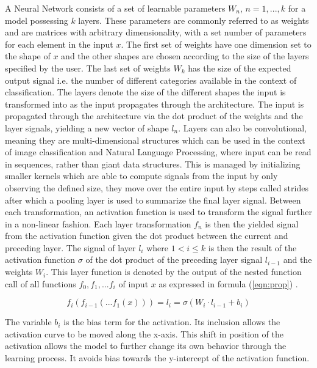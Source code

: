 A Neural Network consists of a set of learnable parameters $W_n$, $n = 1,...,k$ for a model possessing $k$ layers. These parameters are commonly referred to as weights and are matrices with arbitrary dimensionality, with a set number of parameters for each element in the input $x$. The first set of weights have one dimension set to the shape of $x$ and the other shapes are chosen according to the size of the layers specified by the user. The last set of weights $W_k$ has the size of the expected output signal i.e. the number of different categories available in the context of classification. The layers denote the size of the different shapes the input is transformed into as the input propagates through the architecture. The input is propagated through the architecture via the dot product of the weights and the layer signals, yielding a new vector of shape $l_n$. Layers can also be convolutional, meaning they are multi-dimensional structures which can be used in the context of image classification and Natural Language Processing, where input can be read in sequences, rather than giant data structures. This is managed by initializing smaller kernels which are able to compute signals from the input by only observing the defined size, they move over the entire input by steps called strides after which a pooling layer is used to summarize the final layer signal. Between each transformation, an activation function is used to transform the signal further in a non-linear fashion. Each layer transformation $f_n$ is then the yielded signal from the activation function given the dot product between the current and preceding layer. The signal of layer $l_i$ where $ 1 < i \leq k $ is then the result of the activation function $\sigma$ of the dot product of the preceding layer signal $l_{i-1}$ and the weights $W_i$. This layer function is denoted by the output of the nested function call of all functions $f_0, f_1, ... f_i$ of input $x$ as expressed in formula (\ref{eqn:prop}) \cite{wang2003artificial}.

\begin{equation}
\label{eqn:prop}
f_i(f_{i-1}(...f_1(x))) = l_i = \sigma(W_i \cdot l_{i-1} + b_i)
\end{equation}

The variable $b_i$ is the bias term for the activation. Its inclusion allows the activation curve to be moved along the x-axis. This shift in position of the activation allows the model to further change its own behavior through the learning process. It avoids bias towards the y-intercept of the activation function.  

